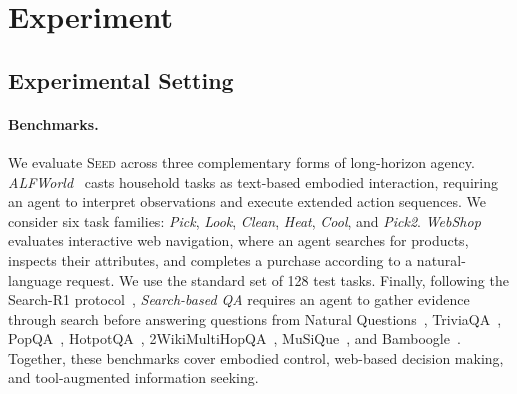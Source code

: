 \section{Experiment}
\subsection{Experimental Setting}

\paragraph{Benchmarks.}
We evaluate \textsc{Seed} across three complementary forms of long-horizon agency. \textit{ALFWorld}~\citep{shridhar2021alfworld} casts household tasks as text-based embodied interaction, requiring an agent to interpret observations and execute extended action sequences. We consider six task families: \textit{Pick}, \textit{Look}, \textit{Clean}, \textit{Heat}, \textit{Cool}, and \textit{Pick2}. \textit{WebShop}~\citep{yao2022webshop} evaluates interactive web navigation, where an agent searches for products, inspects their attributes, and completes a purchase according to a natural-language request. We use the standard set of 128 test tasks. Finally, following the Search-R1 protocol~\citep{jin2025searchr1}, \textit{Search-based QA} requires an agent to gather evidence through search before answering questions from Natural Questions~\citep{kwiatkowski2019natural}, TriviaQA~\citep{joshi2017triviaqa}, PopQA~\citep{mallen2023popqa}, HotpotQA~\citep{yang2018hotpotqa}, 2WikiMultiHopQA~\citep{ho2020constructing}, MuSiQue~\citep{trivedi2022musique}, and Bamboogle~\citep{press2023measuring}. Together, these benchmarks cover embodied control, web-based decision making, and tool-augmented information seeking.

\vspace{-0.08in}

